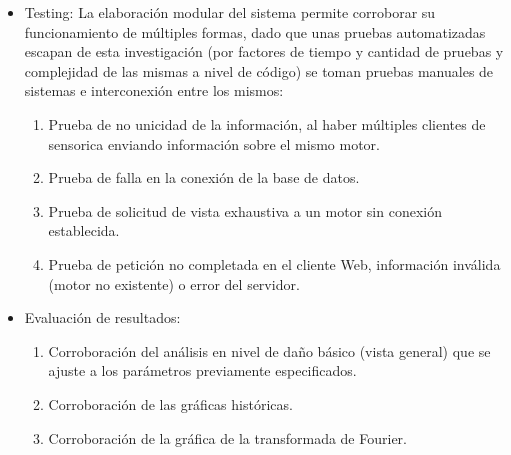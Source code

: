 \begin{itemize}
    \item Testing: La elaboración modular del sistema permite  corroborar su
        funcionamiento de múltiples formas, dado que unas pruebas automatizadas
        escapan de esta investigación (por factores de tiempo y cantidad de pruebas
        y complejidad de las mismas a nivel de código) se toman pruebas manuales
        de sistemas e interconexión entre los mismos:
        \begin{enumerate}
            \item Prueba de no unicidad de la información, al haber múltiples
                clientes de sensorica enviando información sobre el mismo motor.
            \item Prueba de falla en la conexión de la base de datos.
            \item Prueba de solicitud de vista exhaustiva a un motor sin conexión
                establecida.
            \item Prueba de petición no completada en el cliente Web,
            información inválida (motor no existente) o error del servidor.
        \end{enumerate}

    \item Evaluación de resultados:
        \begin{enumerate}
            \item Corroboración del análisis en nivel de daño básico (vista general)
                que se ajuste a los parámetros previamente especificados.
            \item Corroboración de las gráficas históricas.
            \item Corroboración de la gráfica de la transformada de Fourier.
        \end{enumerate}
\end{itemize}


